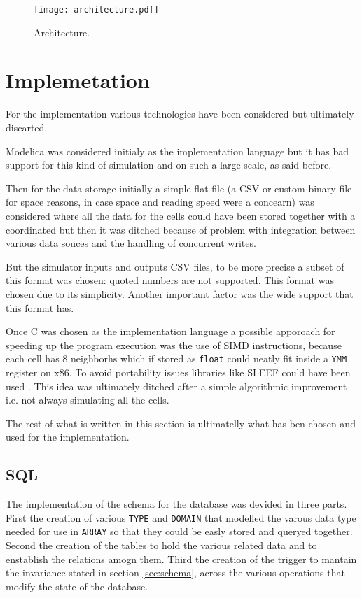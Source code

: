 \documentclass[Lau]{sapthesis} %
\begin{document}
\begin{figure}
\centering
\texttt{[image: architecture.pdf]}
\caption{Architecture.}
\label{fig:architecture}
\end{figure}

\section{Implemetation}%

For the implementation various technologies have been considered but ultimately
discarted.

Modelica was considered initialy as the implementation language but it has bad
support for this kind of simulation and on such a large scale, as said before.

Then for the data storage initially a simple flat file (a CSV \cite{csv} or
custom binary file for space reasons, in case space and reading speed were a
concearn) was considered where all the data for the cells could have been stored
together with a coordinated but then it was ditched because of problem with
integration between various data souces and the handling of concurrent writes.

But the simulator inputs and outputs CSV files, to be more precise a subset of
this format was chosen: quoted numbers are not supported. This format was chosen
due to its simplicity. Another important factor was the wide support that this
format has.

Once C was chosen as the implementation language a possible apporoach for
speeding up the program execution was the use of SIMD instructions, because each
cell has 8 neighborhs which if stored as \texttt{float} could neatly fit inside
a \texttt{YMM} register on x86. To avoid portability issues libraries like SLEEF
could have been used \cite{sleef}. This idea was ultimately ditched after a
simple algorithmic improvement i.e. not always simulating all the cells.

The rest of what is written in this section is ultimatelly what has ben chosen
and used for the implementation.

\subsection{SQL}

The implementation of the schema for the database was devided in three parts.
First the creation of various \texttt{TYPE} and \texttt{DOMAIN} that modelled
the varous data type needed for use in \texttt{ARRAY} so that they could be
easly stored and queryed together. Second the creation of the tables to hold the
various related data and to enstablish the relations amogn them. Third the
creation of the trigger to mantain the invariance stated in section
\ref{sec:schema}, across the various operations that modify the state of the
database.
\end{document}
